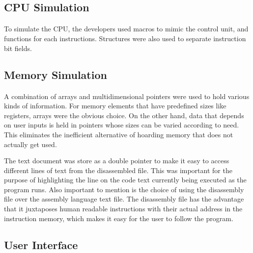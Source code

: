 \documentclass[letterpaper, 11pt, twoside]{article}
\begin{document}
\subsection{CPU Simulation}
\paragraph{}
\begin{flushleft}
To simulate the CPU, the developers used macros to mimic the control unit, and functions for each instructions. Structures were also used to separate instruction bit fields.
\end{flushleft}


\subsection{Memory Simulation}
\paragraph{}
\begin{flushleft}
A combination of arrays and multidimensional pointers were used to hold various kinds of information. For memory elements that have predefined sizes like registers, arrays were the obvious choice. On the other hand, data that depends on user inputs is held in pointers whose sizes can be varied according to need. This eliminates the inefficient alternative of hoarding memory that does not actually get used. 

The text document was store as a double pointer to make it easy to access different lines of text from the disassembled file. This was important for the purpose of highlighting the line on the code text currently being executed as the program runs. Also important to mention is the choice of using the disassembly file over the assembly language text file. The disassembly file has the advantage that it juxtaposes human readable instructions with their actual address in the instruction memory, which makes it easy for the user to follow the program.
\end{flushleft}


\subsection{User Interface}
\end{document}
